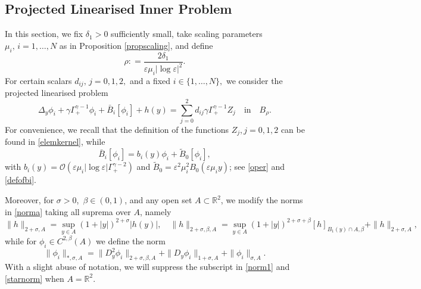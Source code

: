 \documentclass[11pt,reqno,a4paper]{amsart}
\numberwithin{equation}{section}
\newcommand{\R}{\mathbb{R}}
\newcommand{\defeq}{\mathrel{\mathop:}=}
\newcommand{\ve}{\varepsilon}
\begin{document}
\subsection{Projected Linearised Inner Problem}
In this section, we fix $\delta_{1}>0$ sufficiently small, take scaling parameters $\mu_i,\,i=1,\dots,N$ as in Proposition \ref{propscaling}, and define 
\[\rho \defeq \frac{2\delta_1}{\ve\mu_i|\log\ve|^2}.\]
For certain scalars $d_{ij},\,j=0,1,2,$ and a fixed $i\in\{1,\dots,N\},$ we  consider the projected linearised problem
\begin{equation}\label{problemlinearprojected}
    \Delta_{y}\phi_{i}+\gamma\Gamma^{\gamma-1}_{+}\phi_{i}+\bar{B}_i[\phi_{i}]+h(y)=\sum_{j=0}^{2}d_{ij}\gamma\Gamma^{\gamma-1}_{+}Z_j\quad\mbox{in}\quad B_{\rho}.
\end{equation}
For convenience, we recall that the definition of the functions $Z_j, j=0,1,2$ can be found in \eqref{elemkernel}, while 
 \begin{equation}\label{defofBinner}
 \bar{B}_i[\phi_{i}]=b_i(y)\phi_{i}+\widetilde{B}_0[\phi_{i}],
 \end{equation}
 with $b_i(y)=\mathcal{O}\left(\ve\mu_i|\log\ve|\Gamma^{\gamma-2}_{+}\right)$ and $\widetilde{B}_{0}=\ve^2\mu_i^2B_{0}(\ve\mu_i y)$; see \eqref{oper} and \eqref{defofbi}. 

Moreover, for $\sigma>0$,\, $\beta\in(0,1)$, and any open set $A \subset \R^2$, we modify the norms in \eqref{norma} taking all suprema over $A$, namely
\begin{equation}\label{norm1}
\|h\|_{2+\sigma,A}=\sup_{y\in A}\left(1+|y|\right)^{2+\sigma}|h(y)|, \quad \|h\|_{2+\sigma,\beta,A}=\sup_{y\in A}\left(1+|y|\right)^{2+\sigma+\beta}[h]_{B_{1}(y)\cap A,\beta}+\|h\|_{2+\sigma,A},\end{equation}
while for $\phi_{i}\in C^{2,\beta}(A)$ we define the norm
 \begin{equation}\label{starnorm}
 \|\phi_{i}\|_{*,\sigma,A} =  \|  D^2_y\phi_{i} \|_{2+\sigma,\beta,A}   + \|  D_y\phi_{i} \|_{1+\sigma,A}+ \|\phi_{i} \|_{\sigma,A}.
 \end{equation}
With a slight abuse of notation, we will suppress the subscript in \eqref{norm1} and \eqref{starnorm} when $A=\R^2$. 
\end{document}
